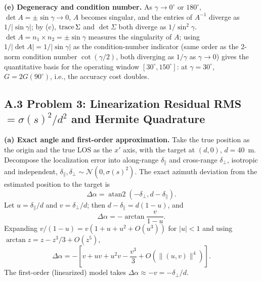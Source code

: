 \noindent\textbf{(e) Degeneracy and condition number.} As $\gamma\to0^\circ$ or $180^\circ$, $\det A=\pm\sin\gamma\to0$, $A$ becomes singular, and the entries of $A^{-1}$ diverge as $1/|\sin\gamma|$; by (c), $\operatorname{trace}\Sigma$ and $\det\Sigma$ both diverge as $1/\sin^2\gamma$. $\det A=n_1\times n_2=\pm\sin\gamma$ measures the singularity of $A$; using $1/|\det A|=1/|\sin\gamma|$ as the condition-number indicator (same order as the 2-norm condition number $\cot(\gamma/2)$, both diverging as $1/\gamma$ as $\gamma\to0$) gives the quantitative basis for the operating window $[30^\circ,150^\circ]$: at $\gamma=30^\circ$, $G=2G(90^\circ)$, i.e., the accuracy cost doubles.

\subsection*{A.3 Problem 3: Linearization Residual RMS $=\sigma(s)^2/d^2$ and Hermite Quadrature}

\noindent\textbf{(a) Exact angle and first-order approximation.} Take the true position as the origin and the true LOS as the $x'$ axis, with the target at $(d,0)$, $d=40$~m. Decompose the localization error into along-range $\delta_\parallel$ and cross-range $\delta_\perp$, isotropic and independent, $\delta_\parallel,\delta_\perp\sim\mathcal{N}(0,\sigma(s)^2)$. The exact azimuth deviation from the estimated position to the target is
\begin{equation}
  \Delta\alpha=\operatorname{atan2}(-\delta_\perp,d-\delta_\parallel).
\end{equation}
Let $u=\delta_\parallel/d$ and $v=\delta_\perp/d$; then $d-\delta_\parallel=d(1-u)$, and
\begin{equation}
  \Delta\alpha=-\arctan\frac{v}{1-u}.
\end{equation}
Expanding $v/(1-u)=v(1+u+u^2+O(u^3))$ for $|u|<1$ and using $\arctan z=z-z^3/3+O(z^5)$,
\begin{equation}
  \Delta\alpha=-\left[v+uv+u^2v-\frac{v^3}{3}+O(\|(u,v)\|^4)\right].
\end{equation}
The first-order (linearized) model takes $\Delta\alpha\approx-v=-\delta_\perp/d$.

